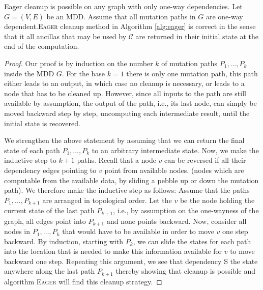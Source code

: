 
\begin{theorem}

Eager cleanup is possible on any graph with only one-way dependencies.  Let
$G=(V,E)$ be an MDD.  Assume that all mutation paths in $G$ are one-way
dependent.\textsc{Eager} cleanup method in Algorithm
\ref{alg:eager} is correct in the sense that it all ancillas that may be used by
${\mathcal C}$ are returned in their initial state at the end of the
computation.

\end{theorem}

\begin{proof}
Our proof is by induction on the number $k$ of mutation paths $P_1, \ldots, P_k$
inside the MDD $G$. For the base $k=1$ there is only one mutation path, this
path either leads to an output, in which case no cleanup is necessary, or leads
to a node that has to be cleaned up. However, since all inputs to the path are
still available by assumption, the output of the path, i.e., its last node, can
simply be moved backward step by step, uncomputing each intermediate result,
until the initial state is recovered.

We strengthen the above statement by assuming that we can return the final state
of each path $P_1, \ldots, P_k$ to an arbitrary intermediate state.  Now, we
make the inductive step to $k+1$ paths. Recall that a node $v$ can be reversed
if all their dependency edges pointing to $v$ point from available nodes. (nodes
which are computable from the available data, by sliding a pebble up or down the
mutation path). We therefore make the inductive
step as follows: Assume that the paths $P_1, \ldots, P_{k+1}$ are arranged in
topological order. Let the $v$ be the node holding the current state of the last
path $P_{k+1}$, i.e., by assumption on the one-wayness of the graph, all edges
point into $P_{k+1}$ and none points backward. Now, consider all nodes in $P_1,
\ldots, P_k$ that would have to be available in order to move $v$ one step
backward. By induction, starting with $P_k$, we can slide the states for each
path into the location that is needed to make this information available for $v$
to move backward one step. Repeating this argument, we see that dependency S the
state anywhere along the last path $P_{k+1}$ thereby showing that cleanup is
possible and algorithm \textsc{Eager} will find this cleanup strategy.

\end{proof}

